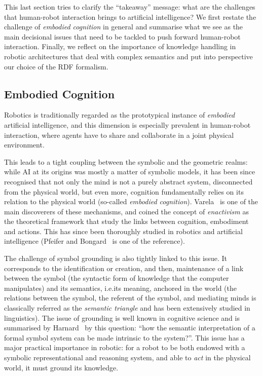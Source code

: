 \documentclass[preprint,3p,times]{elsarticle}
\newcommand{\ie}{{i.e.\xspace}}
\begin{document}
This last section tries to clarify the ``takeaway'' message: what are the
challenges that human-robot interaction brings to artificial intelligence?  We
first restate the challenge of \emph{embodied cognition} in general and
summarise what we see as the main decisional issues that need to be tackled to
push forward human-robot interaction. Finally, we reflect on the importance of
knowledge handling in robotic architectures that deal with complex semantics and
put into perspective our choice of the RDF formalism. 

\subsection{Embodied Cognition}

Robotics is traditionally regarded as the prototypical instance of
\emph{embodied} artificial intelligence, and this dimension is especially
prevalent in human-robot interaction, where agents have to share and collaborate
in a joint physical environment.

This leads to a tight coupling between the symbolic and the geometric realms:
while AI at its origins was mostly a matter of symbolic models, it has been
since recognised that not only the mind is not a purely abstract system,
disconnected from the physical world, but even more, cognition fundamentally
relies on its relation to the physical world (so-called \emph{embodied
cognition}). Varela~\cite{Varela1992} is one of the main discoverers of these
mechanisms, and coined the concept of \emph{enactivism} as the theoretical
framework that study the links between cognition, embodiment and actions.  This
has since been thoroughly studied in robotics and artificial intelligence
(Pfeifer and Bongard~\cite{pfeifer2007body} is one of the reference).

The challenge of symbol grounding is also tightly linked to this issue. It
corresponds to the identification or creation, and then, maintenance of a link
between the symbol (the syntactic form of knowledge that the computer
manipulates) and its semantics, \ie its meaning, anchored in the world (the
relations between the symbol, the referent of the symbol, and mediating minds
is classically referred as the \emph{semantic triangle} and has been
extensively studied in linguistics). The issue of grounding is well known in
cognitive science and is summarised by Harnard~\cite{Harnad1990} by this
question: ``how the semantic interpretation of a formal symbol system can be
made intrinsic to the system?''. This issue has a major practical importance in
robotic: for a robot to be both endowed with a symbolic representational and
reasoning system, and able to \emph{act} in the physical world, it must ground
its knowledge.
\end{document}

